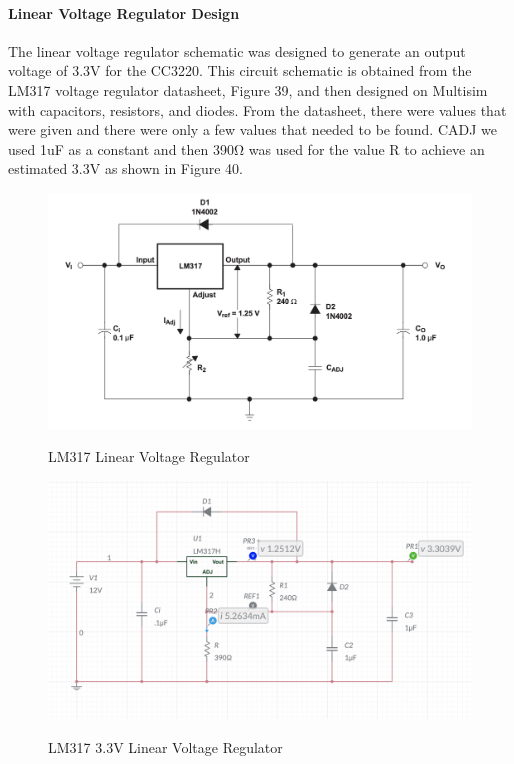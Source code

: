 \paragraph{Linear Voltage Regulator Design}
The linear voltage regulator schematic was designed to generate an output voltage of 3.3V for the CC3220. This circuit schematic is obtained from the LM317 voltage regulator datasheet, Figure 39, and then designed on Multisim with capacitors, resistors, and diodes. From the datasheet, there were values that were given and there were only a few values that needed to be found. CADJ we used 1uF as a constant and then 390Ω was used for the value R to achieve an estimated 3.3V as shown in Figure 40.\par
\begin{figure}[H]
    \centering
    \caption{LM317 Linear Voltage Regulator }
    \includegraphics[width=\textwidth]{images/LM317_Application_schematic.png}
    \label{fig:linear-voltage-regulator}
\end{figure}
\begin{figure}[H]
    \centering
    \caption{LM317 3.3V Linear Voltage Regulator}
    \includegraphics[width=\textwidth]{images/LM317_3.3_schematic.png}
    \label{fig:3.3V-linear-voltage-regulator}
\end{figure}

